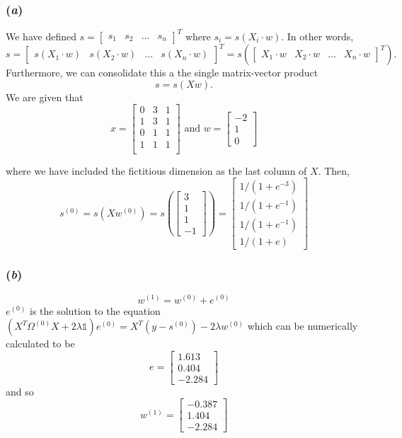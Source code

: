 \documentclass{report}
\begin{document}
\subsubsection*{(\textit{a})}
We have defined $ s = \begin{bmatrix} s_1 & s_2 & \hdots & s_n \end{bmatrix}^T $ where $ s_i = s(X_i \cdot w) $. In other words, 
$$ s = \begin{bmatrix} s(X_1 \cdot w) & s(X_2 \cdot w) & \hdots & s(X_n \cdot w) \end{bmatrix}^T = s\left(\begin{bmatrix} X_1 \cdot w & X_2 \cdot w & \hdots & X_n \cdot w \end{bmatrix}^T\right).$$ 
Furthermore, we can consolidate this a the single matrix-vector product
$$ s = s(Xw) .$$
We are given that 
$$ x = 		\begin{bmatrix}	0 & 3 & 1 \\
						1 & 3 & 1 \\
						0 & 1 & 1 \\
						1 & 1 & 1 \\
			 \end{bmatrix} 
\text{ and } w = 	\begin{bmatrix}	-2 \\ 1 \\ 0 \end{bmatrix} $$

where we have included the fictitious dimension as the last column of $X$. Then,
$$ s^{(0)} = s(Xw^{(0)}) = s\left( \begin{bmatrix} 3 \\ 1 \\ 1 \\ -1 \end{bmatrix} \right) = \begin{bmatrix} 1/(1+e^{-3}) \\ 1/(1+e^{-1}) \\ 1/(1+e^{-1}) \\ 1/(1+e) \end{bmatrix}$$


\subsubsection*{(\textit{b})}

$$ w^{(1)} = w^{(0)} + e^{(0)} $$
$e^{(0)}$ is the solution to the equation  $(X^T \Omega^{(0)} X + 2\lambda\mathbb{1} ) e^{(0)} = X^T(y-s^{(0)}) - 2 \lambda w^{(0)}$ which can be numerically calculated to be 
$$ e = 	\begin{bmatrix} 1.613 \\ 0.404 \\  -2.284 \end{bmatrix} $$
and so
$$ w^{(1)} = \begin{bmatrix} -0.387 \\ 1.404 \\ -2.284 \end{bmatrix} $$
\end{document}
